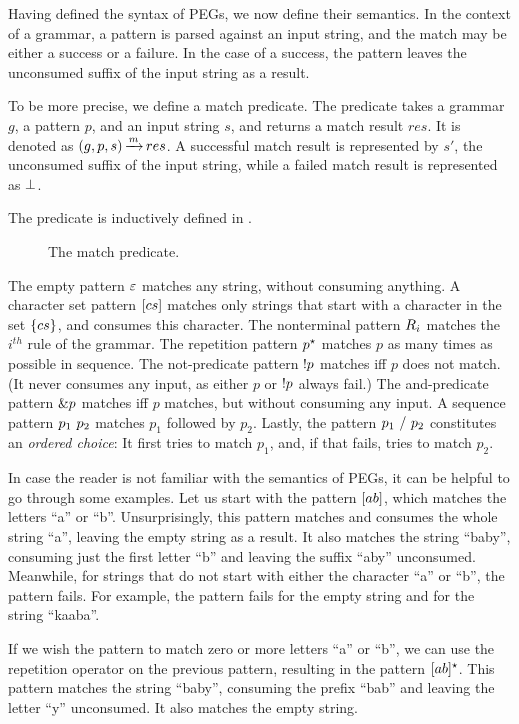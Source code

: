Having defined the syntax of PEGs,
we now define their semantics.
In the context of a grammar,
a pattern is parsed against an input string,
and the match may be either a success or a failure.
In the case of a success,
the pattern leaves the unconsumed suffix
of the input string as a result.

To be more precise,
we define a match predicate.
The predicate
takes a grammar $g$,
a pattern $p$,
and an input string $s$,
and returns a match result $res$.
It is denoted as $(g,p,s) \operatorname{\xrightarrow{\mathit{m}}} res$.
A successful match result is represented by $s'$,
the unconsumed suffix of the input string,
while a failed match result is represented as $\operatorname{\bot}$.

The predicate is inductively defined in .
\begin{figure}
    
    \caption{The match predicate.}
    \label{fig:match}
\end{figure}
The empty pattern $\varepsilon$
matches any string,
without consuming anything.
A character set pattern ${[cs]}$
matches only strings that start with a character in the set $\{cs\}$,
and consumes this character.
The nonterminal pattern ${R_{i}}$
matches the ${i^{th}}$ rule of the grammar.
The repetition pattern ${p^\star}$
matches $p$ as many times as possible
in sequence.
The not-predicate pattern ${!p}$ matches
iff $p$ does not match.
(It never consumes any input,
as either $p$ or ${!p}$ always fail.)
The and-predicate pattern ${\&p}$ matches
iff $p$ matches,
but without consuming any input.
A sequence pattern ${p_1\ p_2}$
matches $p_1$ followed by $p_2$.
Lastly, the pattern ${p_1\ /\ p_2}$
constitutes an \emph{ordered choice}:
It first tries to match $p_1$,
and, if that fails, tries to match $p_2$.

In case the reader is not familiar with the semantics of PEGs,
it can be helpful to go through some examples.
Let us start with the pattern $[ab]$,
which matches the letters ``a'' or ``b''.
Unsurprisingly,
this pattern matches and consumes
the whole string ``a'',
leaving the empty string as a result.
It also matches the string ``baby'',
consuming just the first letter ``b''
and leaving the suffix ``aby'' unconsumed.
Meanwhile, for strings that do not start
with either the character ``a'' or ``b'',
the pattern fails.
For example, the pattern fails for the empty string
and for the string ``kaaba''.

If we wish the pattern to match zero or more letters ``a'' or ``b'',
we can use the repetition operator on the previous pattern,
resulting in the pattern $[ab]^\star$.
This pattern matches the string ``baby'',
consuming the prefix ``bab''
and leaving the letter ``y'' unconsumed.
It also matches the empty string.

